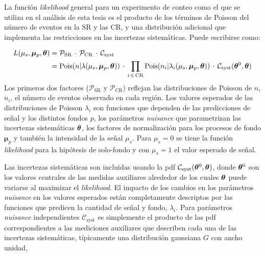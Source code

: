 

La función \emph{likelihood} general para un experimento de conteo como el que se utiliza
en el análisis de esta tesis es el producto de los términos de Poisson del
número de eventos en la SR y las CR, y una distribución adicional que implementa
las restricciones en las incertezas sistemáticas. Puede escribirse como:

\begin{align}
  L(\mu_s, \bm{\mu}_p, \bm{\theta}) &= \mathcal{P}_\text{SR} \, \cdot \, \mathcal{P}_\text{CR} \, \cdot \, \mathcal{C}_\text{syst} \nonumber \\
  &= \operatorname{Pois}(n|\lambda(\mu_s, \bm{\mu}_p, \bm{\theta})) \, \cdot \, \prod_{i \,\in\, \text{CR}} \operatorname{Pois}(n_i|\lambda_i(\mu_s, \bm{\mu}_p, \bm{\theta})) \, \cdot \, \mathcal{C}_\text{syst} (\bm{\theta}^0, \bm{\theta}) \label{eq:model}
\end{align}
%
Los primeros dos factores ($\mathcal{P}_\text{SR}$ y $\mathcal{P}_\text{CR}$)
reflejan las distribuciones de Poisson de $n$, $n_i$, el número de eventos observado
en cada región. Los valores esperados de las distribuciones de Poisson $\lambda_i$ son
funciones que dependen de las predicciones de señal y los distintos fondos $p$,
los parámetros \emph{nuisance} que parametrizan las incertezas sistemáticas $\bm{\theta}$,
los factores de normalización para los procesos de fondo $\bm{\mu}_p$ y también
la intensidad de la señal $\mu_s$. Para $\mu_s = 0$ se tiene la
función \emph{likelihood} para la hipótesis de solo-fondo y con $\mu_s = 1$ el
valor esperado de señal.

Las incertezas sistemáticas son incluidas usando la pdf
$\mathcal{C}_\text{syst}(\bm{\theta}^0, \bm{\theta})$, donde $\bm{\theta}^0$ son los valores centrales
de las medidas auxiliares alrededor de los cuales $\bm{\theta}$ puede variarse al
maximizar el \emph{likelihood}. El impacto de los cambios en los parámetros \emph{nuisance}
en los valores esperados están completamente descriptos por las funciones que
predicen la cantidad de señal y fondo, $\lambda_i$. Para parámetros \emph{nuisance}
independientes $\mathcal{C}_\text{syst}$ es simplemente el producto de las pdf
correspondientes a las mediciones auxiliares que describen cada una de las
incertezas sistemáticas, típicamente una distribución gaussiana $G$ con ancho
unidad,

